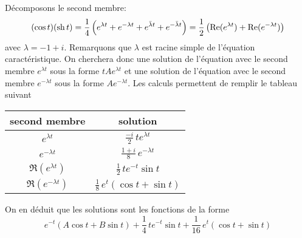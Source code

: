 Décomposons le second membre:
\begin{displaymath}
 (\cos t)(\operatorname{sh} t) = \frac{1}{4}\left( e^{\lambda t} + e^{-\lambda t} +e^{\bar \lambda t}+e^{-\bar \lambda t}\right) 
=\frac{1}{2}\left( \operatorname{Re} (e^{\lambda t}) + \operatorname{Re}(e^{-\lambda t}) \right) 
\end{displaymath}
avec $\lambda = -1+i$.
Remarquons que $\lambda$ est racine simple de l'équation caractéristique. On cherchera donc une solution de l'équation avec le second membre $e^{\lambda t}$ sous la forme $tAe^{\lambda t}$ et une solution de l'équation avec le second membre $e^{-\lambda t}$ sous la forme $Ae^{-\lambda t}$.\newline
Les calculs permettent de remplir le tableau suivant
\begin{center}
\renewcommand{\arraystretch}{1.7}
\begin{tabular}{|c|c|} 
\hline
second membre          & solution \\ \hline
$e^{\lambda t}$        & $\frac{-i}{2}\,te^{\lambda t}$ \\ \hline
$e^{-\lambda t}$       & $\frac{1+i}{8}\,e^{-\lambda t}$\\   \hline
$\Re (e^{\lambda t})$  & $\frac{1}{2}\,te^{-t} \sin t $\\   \hline
$\Re (e^{-\lambda t})$ & $\frac{1}{8}\,e^{t}(\cos t + \sin t)$\\   \hline
\end{tabular}
\end{center}
On en déduit que les solutions sont les fonctions de la forme
\begin{displaymath}
 e^{-t}(A\cos t + B\sin t) + \frac{1}{4}\,te^{-t} \sin t + \frac{1}{16}\,e^{t}(\cos t + \sin t)
\end{displaymath}
